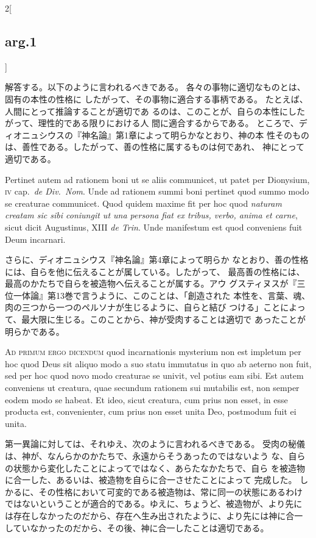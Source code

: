 \documentclass[paper=a4paper,fontsize=10pt,jafontsize=9pt,titlepage]{jlreq}
\begin{document}
\begin{paracol}{2}[\subsection{arg.1}]
\switchcolumn

解答する。以下のように言われるべきである。
各々の事物に適切なものとは、固有の本性の性格に
 したがって、その事物に適合する事柄である。
たとえば、人間にとって推論することが適切であ
 るのは、このことが、自らの本性にしたがって、理性的である限りにおける人
 間に適合するからである。
ところで、ディオニュシウスの『神名論』第1章によって明らかなとおり、神の本
 性そのものは、善性である。したがって、善の性格に属するものは何であれ、
 神にとって適切である。

\switchcolumn*

Pertinet autem ad rationem boni ut se aliis communicet, ut
patet per Dionysium, {\scshape iv} cap.~{\itshape de Div.~Nom}. Unde ad rationem summi boni
pertinet quod summo modo se creaturae communicet. Quod quidem maxime fit
per hoc quod {\itshape naturam creatam sic sibi coniungit ut una persona fiat ex
tribus, verbo, anima et carne}, sicut dicit Augustinus, XIII {\itshape de
Trin}. Unde manifestum est quod conveniens fuit Deum incarnari.

\switchcolumn

さらに、ディオニュシウス『神名論』第4章によって明らか
 なとおり、善の性格には、自らを他に伝えることが属している。したがって、
 最高善の性格には、最高のかたちで自らを被造物へ伝えることが属する。アウ
 グスティヌスが『三位一体論』第13巻で言うように、このことは、「創造された
 本性を、言葉、魂、肉の三つから一つのペルソナが生じるように、自らと結び
 つける」ことによって、最大限に生じる。このことから、神が受肉することは適切で
 あったことが明らかである。

\switchcolumn*[\subsection{ad.1}]

{\scshape Ad primum ergo dicendum} quod incarnationis mysterium non est impletum
per hoc quod Deus sit aliquo modo a suo statu immutatus in quo ab
aeterno non fuit, sed per hoc quod novo modo creaturae se univit, vel
potius eam sibi. Est autem conveniens ut creatura, quae secundum
rationem sui mutabilis est, non semper eodem modo se habeat. Et ideo,
sicut creatura, cum prius non esset, in esse producta est, convenienter,
cum prius non esset unita Deo, postmodum fuit ei unita.

\switchcolumn

第一異論に対しては、それゆえ、次のように言われるべきである。
受肉の秘儀は、神が、なんらかのかたちで、永遠からそうあったのではないよう
 な、自らの状態から変化したことによってではなく、あらたなかたちで、自ら
 を被造物に合一した、あるいは、被造物を自らに合一させたことによって
 完成した。
しかるに、その性格において可変的である被造物は、常に同一の状態にあるわけ
 ではないということが適合的である。ゆえに、ちょうど、被造物が、より先に
 は存在しなかったのだから、存在へ生み出されたように、より先には神に合一
 していなかったのだから、その後、神に合一したことは適切である。


\end{paracol}
\end{document}
